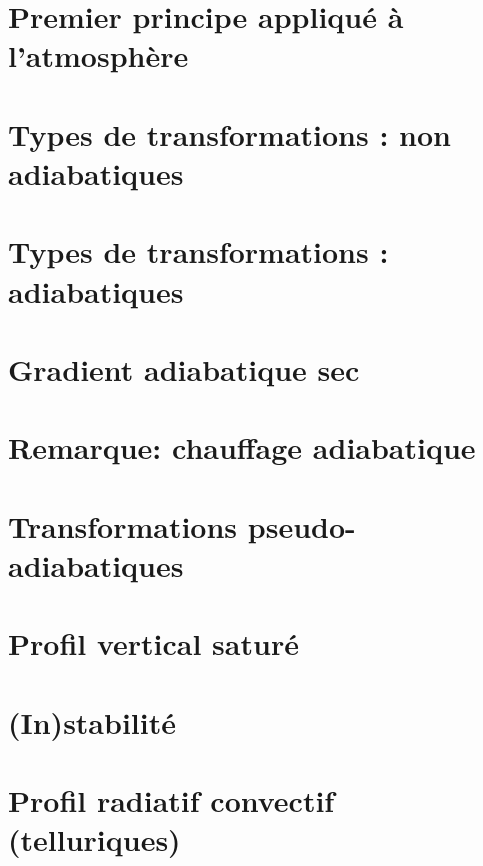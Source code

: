 \documentclass[a4paper,DIV16,10pt]{scrartcl}
\begin{document}
 \inidoc

\newpage
\section{Premier principe appliqué à l'atmosphère}


\section{Types de transformations : non adiabatiques}


\newpage
\section{Types de transformations : adiabatiques}


\newpage
\section{Gradient adiabatique sec}

\section{Remarque: chauffage adiabatique}



\newpage
\section{Transformations pseudo-adiabatiques}


\newpage
\section{Profil vertical saturé}


\newpage
\section{(In)stabilité}


\newpage
\section{Profil radiatif convectif (telluriques)}

\end{document}
